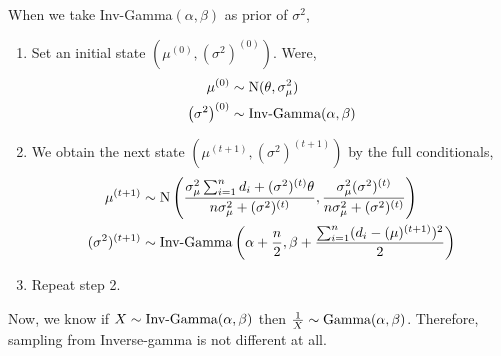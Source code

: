 \begin{example}
    When we take Inv-Gamma$(\alpha,\beta)$ as prior of $ \sigma^{2} $,
    \begin{enumerate}
        \item Set an initial state $ \left( \mu^{(0)}, (\sigma^{2})^{(0)}\right)$. Were,
            \begin{align*}
                \mu^{(0)} &\sim \text{N}(\theta,\sigma_{\mu}^{2}  ) \\ 
                \left(\sigma^{2}\right)^{(0)} &\sim \text{Inv-Gamma}(\alpha,\beta)  
            \end{align*}
        \item We obtain the next state $ \left( \mu^{(t+1)}, (\sigma^{2})^{(t+1)} \right) $ by the full conditionals,
            \begin{align*}
                \mu^{(t+1)} &\sim \text{N}\left( \frac{ \sigma_{\mu}^{2}\sum_{i=1}^{n} d_i + (\sigma^{2})^{(t)} \theta  }{ n \sigma_{\mu}^{2} + (\sigma^{2})^{(t)}  }, \frac{ \sigma_{\mu}^{2}(\sigma^{2})^{(t)}   }{ n \sigma_{\mu}^{2} + (\sigma^{2})^{(t)}  } \right) \\ 
                (\sigma^{2})^{(t+1)} &\sim \text{Inv-Gamma}\left( \alpha + \frac{ n }{ 2 }, \beta + \frac{ \sum_{i=1}^{n} (d_i-(\mu)^{(t+1)} )^{2} }{ 2 } \right)
            \end{align*}
            \item Repeat step 2.
    \end{enumerate}
    Now, we know if $ X\sim \text{Inv-Gamma}(\alpha,\beta) $ then $ \frac{ 1 }{ X } \sim \text{Gamma}(\alpha,\beta)$. Therefore, sampling from Inverse-gamma is not different at all.


\end{example}
